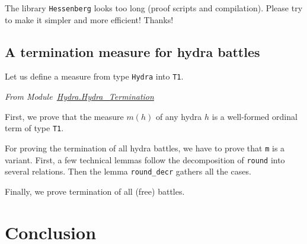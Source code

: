 
    \begin{project}
    The library \texttt{Hessenberg} looks too long (proof scripts and compilation).
    Please try to make it simpler and more efficient!
    Thanks!
    \end{project}

    \subsection{A termination measure for hydra battles }

    \label{sec:hydra-measure}

    Let us define a measure from type \texttt{Hydra} into \texttt{T1}.


    \vspace{4pt}
    \emph{From Module~\href{../theories/html/hydras.Hydra.Hydra_Termination.html\#m}{Hydra.Hydra\_Termination}}

   



    First, we prove that the measure $m(h)$  of any hydra $h$ is a well-formed ordinal term of type \texttt{T1}.

    
   
    For proving the termination of all hydra battles, we have to prove that
    \texttt{m} is a variant. First, a few technical lemmas follow the decomposition of \texttt{round} into several relations. Then the lemma \texttt{round\_decr} gathers all the cases.

    \label{sect:variant-decr}

    
    
    
    
     
 
      Finally, we prove termination of all (free) battles.

    \label{thm:every-battle-terminates}

    

    \section*{Conclusion}


